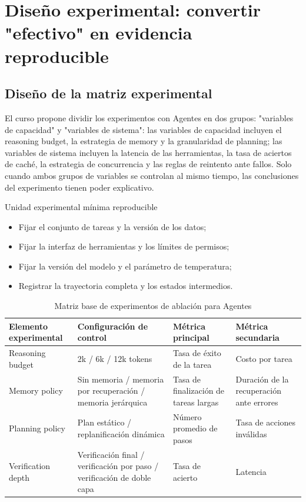 \section{Diseño experimental: convertir "efectivo" en evidencia reproducible}

\subsection{Diseño de la matriz experimental}
El curso propone dividir los experimentos con Agentes en dos grupos: "variables de capacidad" y "variables de sistema": las variables de capacidad incluyen el reasoning budget, la estrategia de memory y la granularidad de planning; las variables de sistema incluyen la latencia de las herramientas, la tasa de aciertos de caché, la estrategia de concurrencia y las reglas de reintento ante fallos. Solo cuando ambos grupos de variables se controlan al mismo tiempo, las conclusiones del experimento tienen poder explicativo.

\begin{knowledgebox}{Unidad experimental mínima reproducible}
\begin{itemize}
    \item Fijar el conjunto de tareas y la versión de los datos;
    \item Fijar la interfaz de herramientas y los límites de permisos;
    \item Fijar la versión del modelo y el parámetro de temperatura;
    \item Registrar la trayectoria completa y los estados intermedios.
\end{itemize}
\end{knowledgebox}

\begin{table}[H]
\centering
\begin{tabular}{p{3.1cm}p{3.3cm}p{2.7cm}p{2.2cm}}
\toprule
\textbf{Elemento experimental} & \textbf{Configuración de control} & \textbf{Métrica principal} & \textbf{Métrica secundaria} \\
\midrule
Reasoning budget & 2k / 6k / 12k tokens & Tasa de éxito de la tarea & Costo por tarea \\
Memory policy & Sin memoria / memoria por recuperación / memoria jerárquica & Tasa de finalización de tareas largas & Duración de la recuperación ante errores \\
Planning policy & Plan estático / replanificación dinámica & Número promedio de pasos & Tasa de acciones inválidas \\
Verification depth & Verificación final / verificación por paso / verificación de doble capa & Tasa de acierto & Latencia \\
\bottomrule
\end{tabular}
\caption{Matriz base de experimentos de ablación para Agentes}
\end{table}

